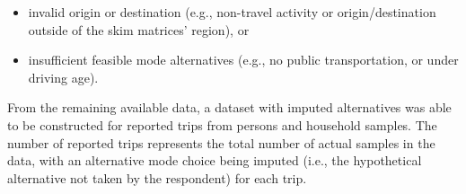 \documentclass[numbered]{trbunofficial}\usepackage[]{graphicx}\usepackage[]{color}
\begin{document}
\begin{itemize}[leftmargin=0.25in, topsep=3pt, itemsep=1pt, parsep=1pt]
  \item invalid origin or destination (e.g., non-travel activity or origin/destination outside of the skim matrices' region), or
  \item insufficient feasible mode alternatives (e.g., no public transportation, or under driving age).
\end{itemize}

From the remaining available data, a dataset with imputed alternatives was able to be constructed for  reported trips from  persons and  household samples. The number of reported trips represents the total number of actual samples in the data, with an alternative mode choice being imputed (i.e., the hypothetical alternative not taken by the respondent) for each trip. 
\end{document}
